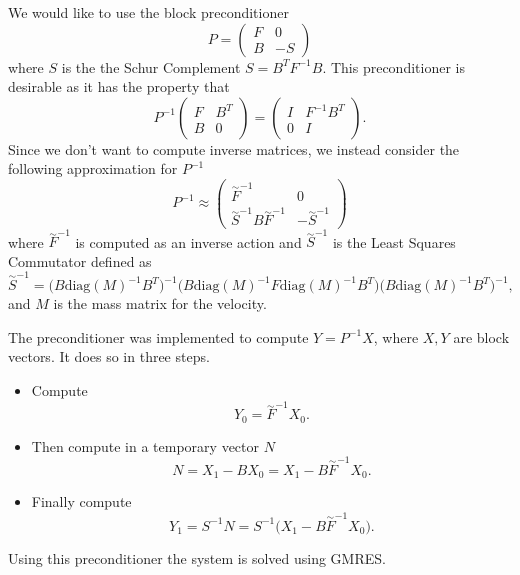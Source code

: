 \documentclass[9pt]{beamer}
\begin{document}
\begin{frame}
	We would like to use the block preconditioner
	$$
		P = \begin{pmatrix}
		F & 0\\
		B & -S
		\end{pmatrix}
	$$
	where $S$ is the the Schur Complement $S = B^TF^{-1}B$. This preconditioner is desirable as it has the property that
	$$
		P^{-1}\begin{pmatrix}
		F & B^T \\
		B & 0
		\end{pmatrix} = \begin{pmatrix}
		I & F^{-1}B^T \\
		0 & I
		\end{pmatrix}.
	$$
	Since we don't want to compute inverse matrices, we instead consider the following approximation for $P^{-1}$
	$$
		P^{-1} \approx \begin{pmatrix}
		\overset{\sim}{F}^{-1} & 0\\
		\overset{\sim}{S}^{-1}B\overset{\sim}{F}^{-1} & -\overset{\sim}{S}^{-1}
		\end{pmatrix}
	$$
	where $\overset{\sim}{F}^{-1}$ is computed as an inverse action and $\overset{\sim}{S}^{-1}$ is the Least Squares Commutator \cite{Precond} defined as
	$$
	\overset{\sim}{S}^{-1} = \big(B\text{diag}(M)^{-1}B^T\big)^{-1}\big(B\text{diag}(M)^{-1}F\text{diag}(M)^{-1}B^T\big)\big(B\text{diag}(M)^{-1}B^T\big)^{-1},
	$$
	and $M$ is the mass matrix for the velocity.
\end{frame}

\begin{frame}
	The preconditioner was implemented to compute $Y = P^{-1}X$, where $X,Y$ are block vectors. It does so in three steps.
	\begin{itemize}
		\item Compute
		$$
			Y_0 = \overset{\sim}{F}^{-1}X_0.
		$$
		\item Then compute in a temporary vector $N$
		$$
			N = X_1 - BX_0 = X_1 - B\overset{\sim}{F}^{-1}X_0.
		$$
		\item Finally compute
		$$
			Y_1 = S^{-1}N = S^{-1}\big(X_1 - B\overset{\sim}{F}^{-1}X_0\big).
		$$
	\end{itemize}

	Using this preconditioner the system is solved using GMRES.
\end{frame}
\end{document}
